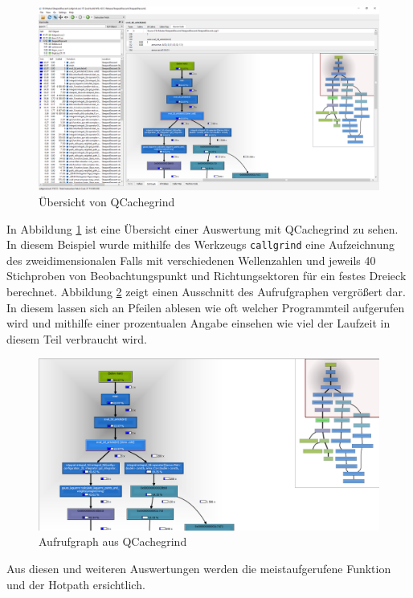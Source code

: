 \begin{figure}
  \includegraphics[width=\textwidth]{images/qcachegrind.png}
  \caption{Übersicht von QCachegrind}\label{qcachegrind}
\end{figure}

In Abbildung \ref{qcachegrind} ist eine Übersicht einer Auswertung mit QCachegrind zu sehen. In diesem Beispiel wurde mithilfe des Werkzeugs \texttt{callgrind} eine Aufzeichnung des zweidimensionalen Falls 
mit verschiedenen Wellenzahlen und jeweils 40 Stichproben von Beobachtungspunkt und Richtungsektoren für ein festes Dreieck berechnet.
Abbildung \ref{qcachegrind_result} zeigt einen Ausschnitt des Aufrufgraphen vergrößert dar. In diesem lassen sich an Pfeilen ablesen wie oft welcher Programmteil aufgerufen wird und mithilfe einer prozentualen Angabe einsehen wie viel der Laufzeit in diesem Teil verbraucht wird.

\begin{figure}
  \includegraphics[width=\textwidth]{images/qcachegrind_callgraph.png}
  \caption{Aufrufgraph aus QCachegrind}\label{qcachegrind_result}
\end{figure}

Aus diesen und weiteren Auswertungen werden die meistaufgerufene Funktion und der Hotpath ersichtlich.

